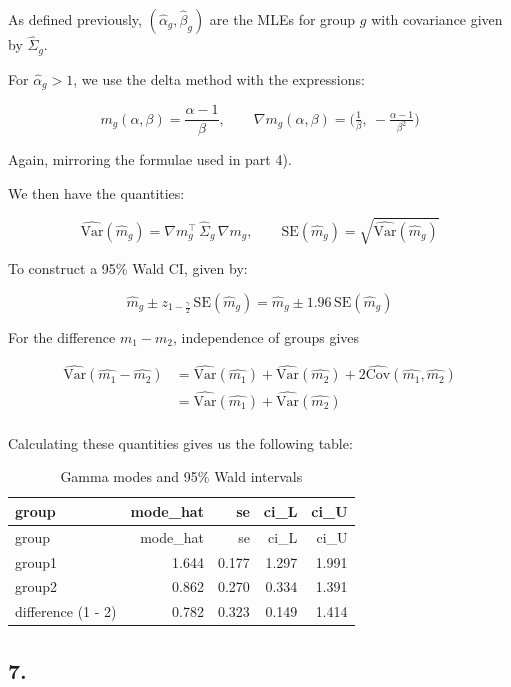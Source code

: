 \documentclass[
]{article}
\begin{document}
As defined previously, \((\hat\alpha_g,\hat\beta_g)\) are the MLEs for
group \(g\) with covariance given by \(\widehat\Sigma_g\).

For \(\hat\alpha_g>1\), we use the delta method with the expressions:

\[
m_g(\alpha,\beta)=\frac{\alpha-1}{\beta},\qquad 
\nabla m_g(\alpha,\beta)=\Big(\tfrac{1}{\beta},\ -\tfrac{\alpha-1}{\beta^2}\Big)
\]

Again, mirroring the formulae used in part 4).

We then have the quantities:

\[
\widehat{\mathrm{Var}}(\hat m_g)=\nabla m_g^\top\,\widehat\Sigma_g\,\nabla m_g,\qquad
\text{SE}(\hat m_g)=\sqrt{\widehat{\mathrm{Var}}(\hat m_g)}
\]

To construct a 95\% Wald CI, given by:

\[
\hat m_g \pm z_{1 - \frac{\gamma}{2}} \,\text{SE}(\hat m_g) =
\hat m_g \pm 1.96\,\text{SE}(\hat m_g)
\]

For the difference \(m_1-m_2\), independence of groups gives

\[
\begin{aligned}
\widehat{\mathrm{Var}}(\hat{m_1}-\hat{m_2})
&= \widehat{\mathrm{Var}}(\hat{m_1})+\widehat{\mathrm{Var}}(\hat{m_2}) + 2\widehat{\mathrm{Cov}}(\hat{m_1}, \hat{m_2})\\
&= \widehat{\mathrm{Var}}(\hat{m_1})+\widehat{\mathrm{Var}}(\hat{m_2}) \\ 
\end{aligned}
\]

Calculating these quantities gives us the following table:

\begin{longtable}[]{@{}lrrrr@{}}
\caption{Gamma modes and 95\% Wald intervals}\tabularnewline
\toprule\noalign{}
group & mode\_hat & se & ci\_L & ci\_U \\
\midrule\noalign{}
\endfirsthead
\toprule\noalign{}
group & mode\_hat & se & ci\_L & ci\_U \\
\midrule\noalign{}
\endhead
\bottomrule\noalign{}
\endlastfoot
group1 & 1.644 & 0.177 & 1.297 & 1.991 \\
group2 & 0.862 & 0.270 & 0.334 & 1.391 \\
difference (1 - 2) & 0.782 & 0.323 & 0.149 & 1.414 \\
\end{longtable}

\newpage

\subsection{7.}\label{section-6}
\end{document}

